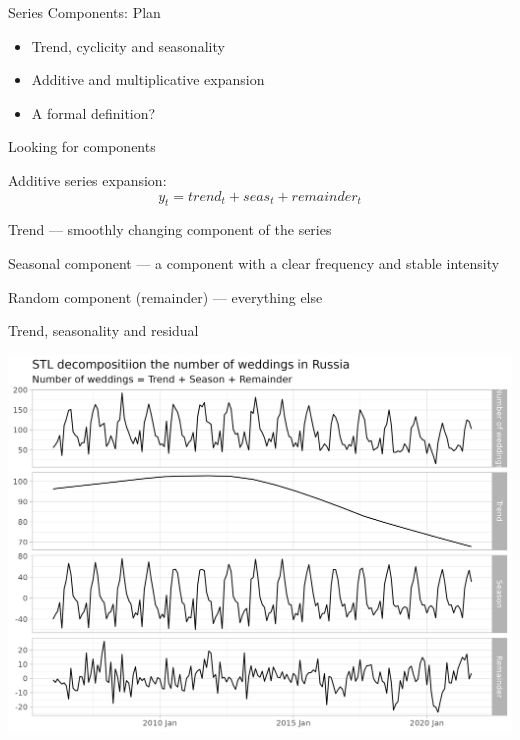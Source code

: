 
\begin{frame} %
	
	
\end{frame}



\begin{frame}{Series Components: Plan}
	\begin{itemize}[<+->]
		\item Trend, cyclicity and seasonality
		\item Additive and multiplicative expansion
		\item A formal definition?
	\end{itemize}
	
\end{frame}


\begin{frame}{Looking for components}
	
	Additive series expansion:
	\[
	y_t = trend_t + seas_t + remainder_t
	\]
	
	\pause
	
	\alert{Trend} — smoothly changing component of the series
	
	\pause
	
	\alert{Seasonal component} — a component with a clear frequency and stable intensity
	
	\pause
	
	\alert{Random component} (remainder) — everything else
	
\end{frame}

\begin{frame}{Trend, seasonality and residual}
	
	\includegraphics[width=\textwidth]{pictures/om_ts_01-041.png}
	
\end{frame}

